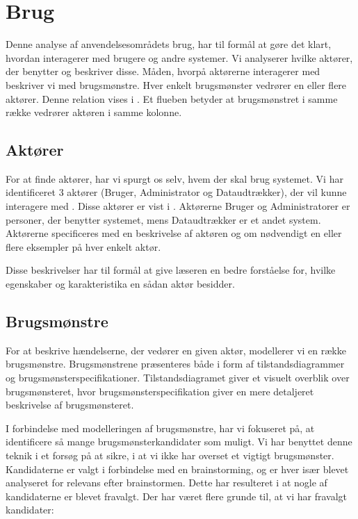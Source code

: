 \section{Brug}
\label{sec:brug}
Denne analyse af anvendelsesområdets brug, har til formål at gøre det klart, hvordan \Foodl{} interagerer med brugere og andre systemer. Vi analyserer hvilke aktører, der benytter \Foodl{} og beskriver disse. Måden, hvorpå aktørerne interagerer med \Foodl{} beskriver vi med brugsmønstre. Hver enkelt brugsmønster vedrører en eller flere aktører. Denne relation vises i . Et flueben betyder at brugsmønstret i samme række vedrører aktøren i samme kolonne.



\subsection{Aktører}
\label{sec:aktoerer}
For at finde aktører, har vi spurgt os selv, hvem der skal brug systemet. Vi har identificeret 3 aktører (Bruger, Administrator og Dataudtrækker), der vil kunne interagere med \Foodl{}.  Disse aktører er vist i . Aktørerne Bruger og Administratorer er personer, der benytter systemet, mens Dataudtrækker er et andet system. Aktørerne specificeres med en beskrivelse af aktøren og om nødvendigt en eller flere eksempler på hver enkelt aktør.

Disse beskrivelser har til formål at give læseren en bedre forståelse for, hvilke egenskaber og karakteristika en sådan aktør besidder. 



\subsection{Brugsmønstre}
\label{subsec:brugsmoenstre}
For at beskrive hændelserne, der vedører en given aktør, modellerer vi en række brugsmønstre. Brugsmønstrene præsenteres både i form af  tilstandsdiagrammer og brugsmønsterspecifikationer. Tilstandsdiagramet giver et visuelt overblik over brugsmønsteret, hvor brugsmønsterspecifikation giver en mere detaljeret beskrivelse af brugsmønsteret.

I forbindelse med modelleringen af brugsmønstre, har vi fokuseret på, at identificere så mange brugsmønsterkandidater som muligt. Vi har benyttet denne teknik i et forsøg på at sikre, i at vi ikke har overset et vigtigt brugsmønster. Kandidaterne er valgt i forbindelse med en brainstorming, og er hver især blevet analyseret for relevans efter brainstormen. Dette har resulteret i at nogle af kandidaterne er blevet fravalgt. Der har været flere grunde til, at vi har fravalgt kandidater:

